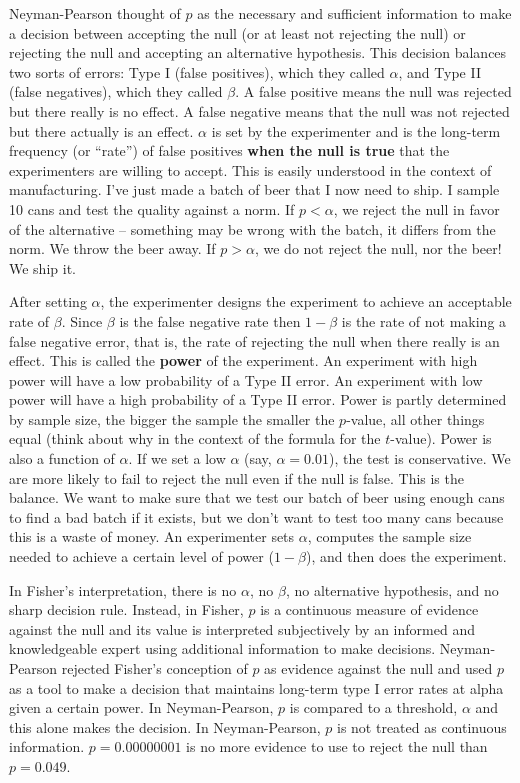 \documentclass[]{book}
\theoremstyle{definition}
\theoremstyle{definition}
\theoremstyle{definition}
\theoremstyle{remark}
\begin{document}
Neyman-Pearson thought of \(p\) as the necessary and sufficient
information to make a decision between accepting the null (or at least
not rejecting the null) or rejecting the null and accepting an
alternative hypothesis. This decision balances two sorts of errors: Type
I (false positives), which they called \(\alpha\), and Type II (false
negatives), which they called \(\beta\). A false positive means the null
was rejected but there really is no effect. A false negative means that
the null was not rejected but there actually is an effect. \(\alpha\) is
set by the experimenter and is the long-term frequency (or ``rate'') of
false positives \textbf{when the null is true} that the experimenters
are willing to accept. This is easily understood in the context of
manufacturing. I've just made a batch of beer that I now need to ship. I
sample 10 cans and test the quality against a norm. If \(p < \alpha\),
we reject the null in favor of the alternative -- something may be wrong
with the batch, it differs from the norm. We throw the beer away. If
\(p > \alpha\), we do not reject the null, nor the beer! We ship it.

After setting \(\alpha\), the experimenter designs the experiment to
achieve an acceptable rate of \(\beta\). Since \(\beta\) is the false
negative rate then \(1-\beta\) is the rate of not making a false
negative error, that is, the rate of rejecting the null when there
really is an effect. This is called the \textbf{power} of the
experiment. An experiment with high power will have a low probability of
a Type II error. An experiment with low power will have a high
probability of a Type II error. Power is partly determined by sample
size, the bigger the sample the smaller the \(p\)-value, all other
things equal (think about why in the context of the formula for the
\(t\)-value). Power is also a function of \(\alpha\). If we set a low
\(\alpha\) (say, \(\alpha=0.01\)), the test is conservative. We are more
likely to fail to reject the null even if the null is false. This is the
balance. We want to make sure that we test our batch of beer using
enough cans to find a bad batch if it exists, but we don't want to test
too many cans because this is a waste of money. An experimenter sets
\(\alpha\), computes the sample size needed to achieve a certain level
of power (\(1-\beta\)), and then does the experiment.

In Fisher's interpretation, there is no \(\alpha\), no \(\beta\), no
alternative hypothesis, and no sharp decision rule. Instead, in Fisher,
\(p\) is a continuous measure of evidence against the null and its value
is interpreted subjectively by an informed and knowledgeable expert
using additional information to make decisions. Neyman-Pearson rejected
Fisher's conception of \(p\) as evidence against the null and used \(p\)
as a tool to make a decision that maintains long-term type I error rates
at alpha given a certain power. In Neyman-Pearson, \(p\) is compared to
a threshold, \(\alpha\) and this alone makes the decision. In
Neyman-Pearson, \(p\) is not treated as continuous information.
\(p=0.00000001\) is no more evidence to use to reject the null than
\(p=0.049\).
\end{document}
